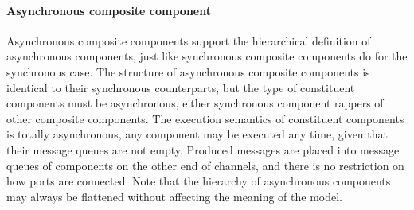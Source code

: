 \paragraph{Asynchronous composite component}
Asynchronous composite components support the hierarchical definition of asynchronous components, just like synchronous composite components do for the synchronous case. The structure of asynchronous composite components is identical to their synchronous counterparts, but the type of constituent components must be asynchronous, \ie either synchronous component rappers of other composite components. The execution semantics of constituent components is totally asynchronous, any component may be executed any time, given that their message queues are not empty. Produced messages are placed into message queues of components on the other end of channels, and there is no restriction on how ports are connected.
Note that the hierarchy of asynchronous components may always be flattened without affecting the meaning of the model.




